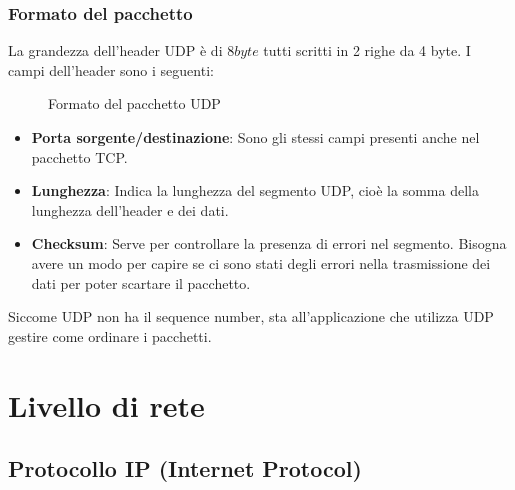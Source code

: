 \documentclass[a4paper]{article}
\begin{document}
\subsubsection{Formato del pacchetto}
La grandezza dell'header UDP è di \( 8 byte \) tutti scritti in 2 righe da 4 byte. I
campi dell'header sono i seguenti:
\begin{figure}[H]
  \centering
  \caption{Formato del pacchetto UDP}
\end{figure}

\begin{itemize}
  \item \textbf{Porta sorgente/destinazione}: Sono gli stessi campi presenti anche nel
    pacchetto TCP.

  \item \textbf{Lunghezza}: Indica la lunghezza del segmento UDP, cioè la somma della
    lunghezza dell'header e dei dati.

  \item \textbf{Checksum}: Serve per controllare la presenza di errori nel segmento.
    Bisogna avere un modo per capire se ci sono stati degli errori nella trasmissione dei
    dati per poter scartare il pacchetto.
\end{itemize}
Siccome UDP non ha il sequence number, sta all'applicazione che utilizza UDP gestire
come ordinare i pacchetti.


\section{Livello di rete}
\subsection{Protocollo IP (Internet Protocol)}
\end{document}
